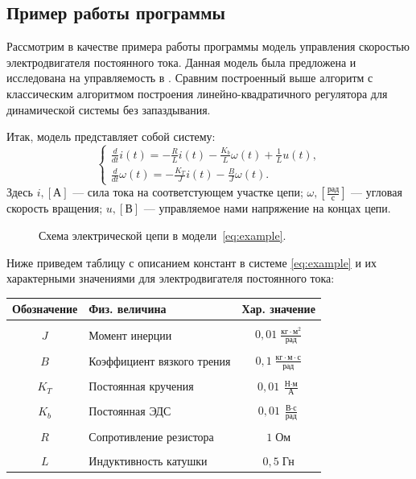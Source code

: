\subsection{Пример работы программы}
\label{sec:continuous-example}

Рассмотрим в качестве примера работы программы модель управления скоростью электродвигателя постоянного тока. Данная модель была предложена и исследована на управляемость в \cite{baghdad}. Сравним построенный выше алгоритм с классическим алгоритмом построения линейно-квадратичного регулятора для динамической системы без запаздывания.

Итак, модель представляет собой систему:
\begin{equation}\label{eq:example}
\begin{cases}
\frac{d}{dt}i(t)
=
-\frac{R}{L}i(t)
-
\frac{K_b}{L}\omega(t)
+
\frac{1}{L}u(t),\\
\frac{d}{dt}\omega(t)
=
-\frac{K_T}{J}i(t)
-
\frac{B}{J}\omega(t).
\end{cases}
\end{equation}
Здесь $i,[\mbox{А}]$ --- сила тока на соответстующем участке цепи; $\omega,\left[\frac{\mbox{рад}}{\mbox{с}}\right]$ --- угловая скорость вращения; $u,[\mbox{В}]$ --- управляемое нами напряжение на концах цепи. 

\begin{figure}[bh]
        \vspace{0.5cm}
        \centering
        
        \caption{Схема электрической цепи в модели~\eqref{eq:example}.}
        \vspace{0.5cm}
\end{figure}

Ниже приведем таблицу с описанием констант в системе \eqref{eq:example} и их характерными значениями для электродвигателя постоянного тока:

\begin{center}
\begin{tabular}{|c|l|c|}
\hline
Обозначение
&
Физ. величина
&
Хар. значение\\
\hline
&&\\
$J$
&
Момент инерции
&
$0,\!01\;\frac{\mbox{кг}\cdot\mbox{м}^2}{\mbox{рад}}$\\
\hline
&&\\
$B$
&
Коэффициент вязкого трения
&
$0,\!1\;\frac{\mbox{кг}\cdot\mbox{м}\cdot\mbox{с}}{\mbox{рад}}$
\\
\hline
&&\\
$K_T$
&
Постоянная кручения
&
$0,\!01\;\frac{\mbox{Н}\cdot\mbox{м}}{\mbox{А}}$
\\
\hline
&&\\
$K_b$
&
Постоянная ЭДС
&
$0,\!01\;\frac{\mbox{В}\cdot\mbox{с}}{\mbox{рад}}$
\\
\hline
&&\\
$R$
&
Сопротивление резистора
&
$1\;\mbox{Ом}$
\\
\hline
&&\\
$L$
&
Индуктивность катушки
&
$0,\!5\;\mbox{Гн}$
\\
\hline
\end{tabular}
\end{center}

